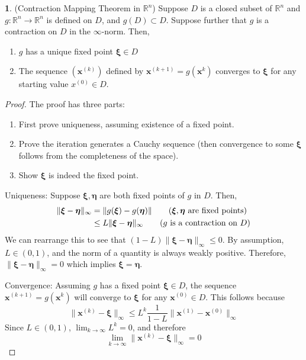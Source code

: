 \documentclass[12pt]{article}
\theoremstyle{definition}
\newcommand{\R}{\mathbb{R}}
\newcommand{\norm}[1]{\lVert#1\rVert}
\newcommand{\x}{\bm{x}}
\newcommand{\xib}{\bm{\xi}}
\newtheorem{theorem}{\color{ForestGreen}{\textbf{Theorem}}}
\theoremstyle{definition}
\begin{document}
\begin{theorem}(Contraction Mapping Theorem in $\R^n$)
Suppose $D$ is a closed subset of $\R^n$ and $g: \R^n \to \R^n$ is defined on $D$, and $g(D) \subset D$. Suppose further that $g$ is a contraction on $D$ in the $\infty$-norm. Then,
\begin{enumerate}
	\item $g$ has a unique fixed point $\xib \in D$
	\item The sequence $(\x^{(k)})$ defined by $\x^{(k+1)} = g(\x^{k})$ converges to $\xib$ for any starting value $x^{(0)} \in D$.
\end{enumerate}
\end{theorem}

\begin{proof}
The proof has three parts:
\begin{enumerate}
	\item First prove uniqueness, assuming existence of a fixed point.
	\item Prove the iteration generates a Cauchy sequence (then convergence to some $\xib$ follows from the completeness of the space).
	\item Show $\xib$ is indeed the fixed point.
\end{enumerate}

Uniqueness: Suppose $\xib, \bm \eta$ are both fixed points of $g$ in $D$. Then,
\begin{align*}
	\norm{\xib - \bm \eta}_\infty &= \norm{g(\xib) - g(\bm \eta)} \tag{$\xib, \bm \eta$ are fixed points} \\
	&\leq L \norm{\xib - \bm \eta}_\infty \tag{$g$ is a contraction on $D$}
\end{align*}
We can rearrange this to see that $(1-L)\norm{\xib - \bm \eta}_\infty \leq 0$. By assumption, $L\in (0,1)$, and the norm of a quantity is always weakly positive. Therefore, $\norm{\xib - \bm \eta}_\infty = 0$ which implies $\xib = \bm \eta$. 

Convergence: Assuming $g$ has a fixed point $\xib \in D$, the sequence $\x^{(k+1)} = g(\x^{k})$ will converge to $\xib$ for any $\x^{(0)} \in D$. This follows because
\begin{equation}
	\norm{\x^{(k)} - \xib}_\infty \leq L^k \frac{1}{1-L} \norm{\x^{(1)} - \x^{(0)}}_\infty
\end{equation}
Since $L \in (0,1)$, $\lim_{k\to\infty} L^k = 0$, and therefore
\begin{equation}
	\lim_{k \to \infty} \norm{\x^{(k)} - \xib}_\infty = 0
\end{equation}


\end{proof}
\end{document}
